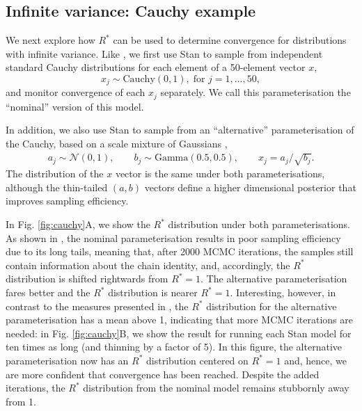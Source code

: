 \documentclass{article}
\newcommand{\N}{\mathcal{N}}
\begin{document}
\subsection{Infinite variance: Cauchy example}
We next explore how $R^*$ can be used to determine convergence for distributions with infinite variance. Like \cite{vehtari2019rank}, we first use Stan to sample from independent standard Cauchy distributions for each element of a 50-element vector $x$,
%
\begin{equation}
x_j\sim \text{Cauchy}(0, 1),\; \text{for } j=1,...,50,
\end{equation}
%
and monitor convergence of each $x_j$ separately. We call this parameterisation the ``nominal'' version of this model.

In addition, we also use Stan to sample from an ``alternative'' parameterisation of the Cauchy, based on a scale mixture of Gaussians \cite{vehtari2019rank},
%
\begin{align}
a_j \sim  \N(0,1), \qquad
b_j \sim  \text{Gamma}(0.5, 0.5), \qquad
x_j =  a_j/\sqrt{b_j}.
\end{align}
%
The distribution of the $x$ vector is the same under both parameterisations, although the thin-tailed $(a,b)$ vectors define a higher dimensional posterior that improves sampling efficiency.

In Fig. \ref{fig:cauchy}A, we show the $R^*$ distribution under both parameterisations. As shown in \cite{vehtari2019rank}, the nominal parameterisation results in poor sampling efficiency due to its long tails, meaning that, after 2000 MCMC iterations, the samples still contain information about the chain identity, and, accordingly, the $R^*$ distribution is shifted rightwards from $R^*=1$. The alternative parameterisation fares better and the $R^*$ distribution is nearer $R^*=1$. Interesting, however, in contrast to the measures presented in \cite{vehtari2019rank}, the $R^*$ distribution for the alternative parameterisation has a mean above 1, indicating that more MCMC iterations are needed: in Fig. \ref{fig:cauchy}B, we show the result for running each Stan model for ten times as long (and thinning by a factor of 5). In this figure, the alternative parameterisation now has an $R^*$ distribution centered on $R^*=1$ and, hence, we are more confident that convergence has been reached. Despite the added iterations, the $R^*$ distribution from the nominal model remains stubbornly away from 1.
\end{document}

